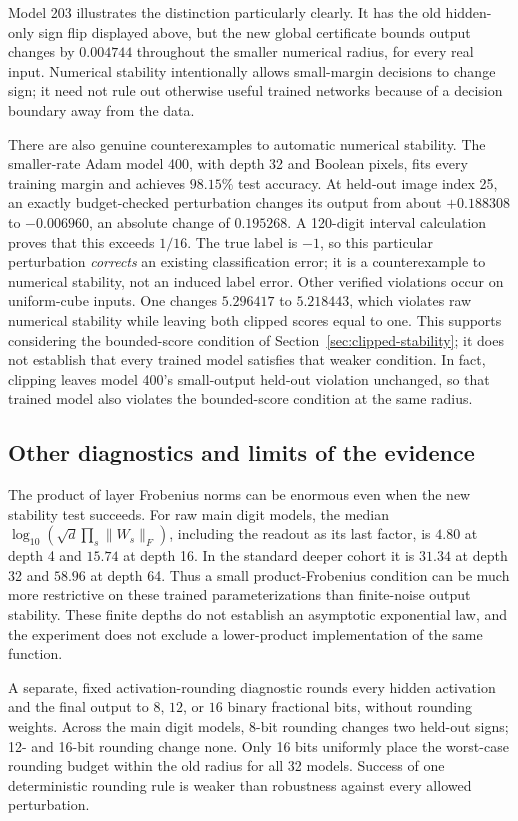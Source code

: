 Model 203 illustrates the distinction particularly clearly. It has the
old hidden-only sign flip displayed above, but the new global certificate
bounds output changes by $0.004744$ throughout the smaller numerical
radius, for every real input. Numerical stability intentionally allows
small-margin decisions to change sign; it need not rule out otherwise
useful trained networks because of a decision boundary away from the data.

There are also genuine counterexamples to automatic numerical stability.
The smaller-rate Adam model 400, with depth 32 and Boolean pixels, fits
every training margin and achieves $98.15\%$ test accuracy. At held-out
image index 25, an exactly budget-checked perturbation changes its output
from about $+0.188308$ to $-0.006960$, an absolute change of $0.195268$.
A 120-digit interval calculation proves that this exceeds $1/16$.
The true label is $-1$, so this particular perturbation \emph{corrects}
an existing classification error; it is a counterexample to numerical
stability, not an induced label error. Other verified violations occur
on uniform-cube inputs. One changes $5.296417$ to $5.218443$, which violates
raw numerical stability while leaving both clipped scores equal to one.
This supports considering the bounded-score condition of
Section~\ref{sec:clipped-stability}; it does not establish that every
trained model satisfies that weaker condition. In fact, clipping leaves
model 400's small-output held-out violation unchanged, so that trained
model also violates the bounded-score condition at the same radius.

\subsection{Other diagnostics and limits of the evidence}

The product of layer Frobenius norms can be enormous even when the new
stability test succeeds. For raw main digit models, the median
$\log_{10}(\sqrt d\prod_s\|W_s\|_F)$, including the readout as its last
factor, is $4.80$ at depth 4 and $15.74$ at depth 16. In the standard
deeper cohort it is $31.34$ at depth 32 and $58.96$ at depth 64. Thus a
small product-Frobenius condition can be much more restrictive on these
trained parameterizations than finite-noise output stability. These finite
depths do not establish an asymptotic exponential law, and the experiment
does not exclude a lower-product implementation of the same function.

A separate, fixed activation-rounding diagnostic rounds every hidden
activation and the final output to $8$, $12$, or $16$ binary fractional
bits, without rounding weights. Across the main digit models, 8-bit
rounding changes two held-out signs; 12- and 16-bit rounding change none.
Only 16 bits uniformly place the worst-case rounding budget within the
old radius for all 32 models. Success of one deterministic rounding rule
is weaker than robustness against every allowed perturbation.

